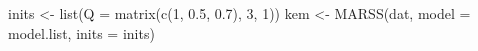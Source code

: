 \begin{Schunk}
\begin{Sinput}
 inits <- list(Q = matrix(c(1, 0.5, 0.7), 3, 1))
 kem <- MARSS(dat, model = model.list, inits = inits)
\end{Sinput}
\end{Schunk}
